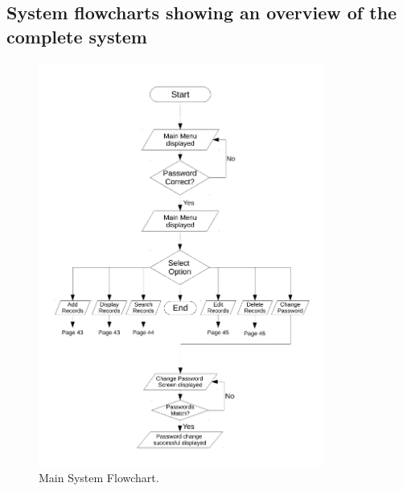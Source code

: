 \newpage

\subsection{System flowcharts showing an overview of the complete system}

\begin{figure}[H]
    \begin{center}
        \includegraphics[width=355px]{./Design/system_flowcharts/PDFs/main_system_flowchart.pdf}
    \end{center}
    \caption{Main System Flowchart.} \label{fig:print_function_result}
\end{figure}

